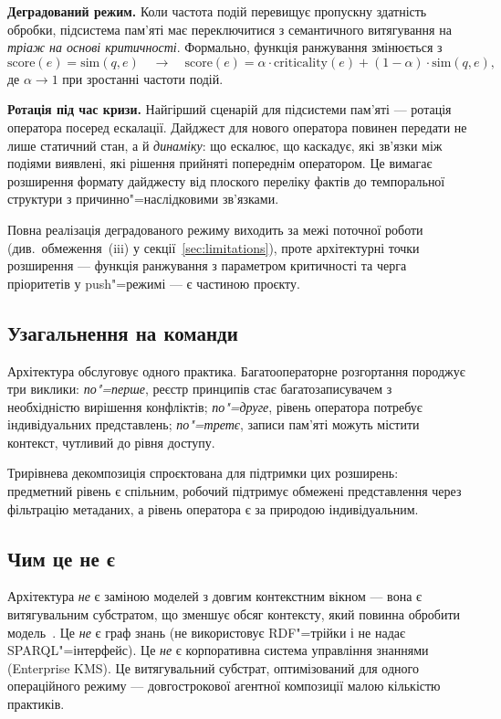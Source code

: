 \documentclass[11pt]{article}
\begin{document}
\textbf{Деградований режим.}
Коли частота подій перевищує пропускну здатність обробки, підсистема пам'яті має переключитися з семантичного витягування на \emph{тріаж на основі критичності}.
Формально, функція ранжування змінюється з
\[
  \mathrm{score}(e) = \mathrm{sim}(q, e)
  \quad\longrightarrow\quad
  \mathrm{score}(e) = \alpha \cdot \mathrm{criticality}(e) + (1-\alpha) \cdot \mathrm{sim}(q, e),
\]
де $\alpha \to 1$ при зростанні частоти подій.

\textbf{Ротація під час кризи.}
Найгірший сценарій для підсистеми пам'яті --- ротація оператора посеред ескалації.
Дайджест для нового оператора повинен передати не лише статичний стан, а й \emph{динаміку}: що ескалює, що каскадує, які зв'язки між подіями виявлені, які рішення прийняті попереднім оператором.
Це вимагає розширення формату дайджесту від плоского переліку фактів до темпоральної структури з причинно"=наслідковими зв'язками.

Повна реалізація деградованого режиму виходить за межі поточної роботи (див.~обмеження~(iii) у секції~\ref{sec:limitations}), проте архітектурні точки розширення --- функція ранжування з параметром критичності та черга пріоритетів у push"=режимі --- є частиною проєкту.

\subsection{Узагальнення на команди}
\label{sec:disc-teams}

Архітектура обслуговує одного практика.
Багатооператорне розгортання породжує три виклики:
\emph{по"=перше}, реєстр принципів стає багатозаписувачем з необхідністю вирішення конфліктів;
\emph{по"=друге}, рівень оператора потребує індивідуальних представлень;
\emph{по"=третє}, записи пам'яті можуть містити контекст, чутливий до рівня доступу.

Трирівнева декомпозиція спроєктована для підтримки цих розширень: предметний рівень є спільним, робочий підтримує обмежені представлення через фільтрацію метаданих, а рівень оператора є за природою індивідуальним.

\subsection{Чим це не є}
\label{sec:disc-not}

Архітектура \emph{не} є заміною моделей з довгим контекстним вікном --- вона є витягувальним субстратом, що зменшує обсяг контексту, який повинна обробити модель~\citep{reid2024gemini, liu2023lost}.
Це \emph{не} є граф знань (не використовує RDF"=трійки і не надає SPARQL"=інтерфейс).
Це \emph{не} є корпоративна система управління знаннями (Enterprise KMS).
Це витягувальний субстрат, оптимізований для одного операційного режиму --- довгострокової агентної композиції малою кількістю практиків.
\end{document}
